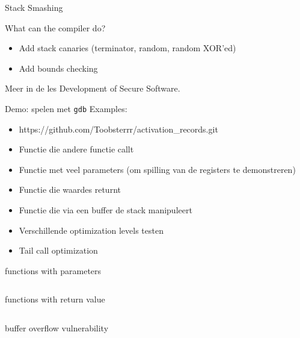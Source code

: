 \documentclass{beamer}
\begin{document}
\begin{frame}{Stack Smashing}
\begin{block}{What can the compiler do?}
\begin{itemize}
    \item Add stack canaries (terminator, random, random XOR'ed)
    \item Add bounds checking
\end{itemize}
\end{block}
Meer in de les Development of Secure Software.
\end{frame}

\begin{frame}{Demo: spelen met \texttt{gdb}}
    Examples:
    \begin{itemize}
        \item https://github.com/Toobsterrr/activation\_records.git
        \item Functie die andere functie callt
        \item Functie met veel parameters (om spilling van de registers te demonstreren)
        \item Functie die waardes returnt
        \item Functie die via een buffer de stack manipuleert
        \item Verschillende optimization levels testen
        \item Tail call optimization
    \end{itemize}
\end{frame}

\begin{frame}{functions with parameters}
    \inputminted{c}{functions_calls_parameters.c}
\end{frame}

\begin{frame}{functions with return value}
    \inputminted{c}{functions_calls_return.c}
\end{frame}

\begin{frame}{buffer overflow vulnerability}
    \inputminted{c}{buffer_overflow_function.c}
\end{frame}
\end{document}
